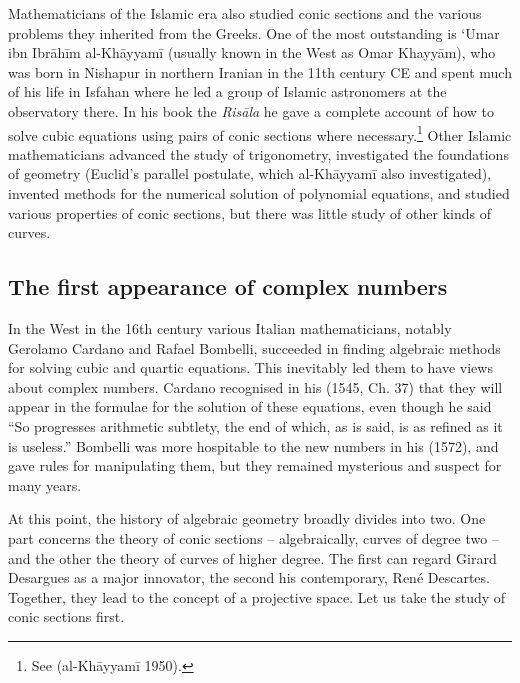 Mathematicians of the Islamic era  also studied conic sections and the various problems they inherited from the Greeks. One of the most outstanding is `Umar ibn Ibr\={a}h\={i}m al-Kh\={a}yyam\={i} (usually known in the West as Omar Khayy\={a}m), who was born in Nishapur in northern Iranian  in the 11th century CE and spent much of his life in Isfahan where he led a group of Islamic astronomers at the observatory there. In his book the \emph{Ris\={a}la} he 
 gave a complete account of how to solve cubic equations using pairs of conic sections where necessary.\footnote{See (al-Kh\={a}yyam\={i} 1950).} Other Islamic mathematicians advanced the study of trigonometry, investigated the foundations of geometry (Euclid's parallel postulate, which al-Kh\={a}yyam\={i} also investigated), invented methods for the numerical solution of polynomial equations, and studied various properties of conic sections, but there was little study of other kinds of curves. 
 
\subsection{The first appearance of complex numbers} 
In the West in the 16th century various Italian mathematicians, notably Gerolamo Cardano and Rafael Bombelli, succeeded in finding algebraic methods for solving cubic and quartic equations. This inevitably led them to have views about complex numbers. Cardano recognised in his  (1545, Ch. 37) that they will appear in the formulae for the solution of these equations, even though he said ``So progresses arithmetic subtlety, the end of which, as is said, is as refined as it is useless.'' Bombelli was more hospitable to the new numbers in his  (1572), and gave rules for manipulating them, but they remained mysterious and suspect for many years.



At this point, the history of algebraic geometry broadly divides into two. One part concerns the theory of conic sections -- algebraically, curves of degree two -- and the other the theory of curves of higher degree. The first can regard Girard Desargues as a major innovator, the second his contemporary,  Ren\'e Descartes. Together, they lead to the concept of a projective space. Let us take the study of conic sections first. 


